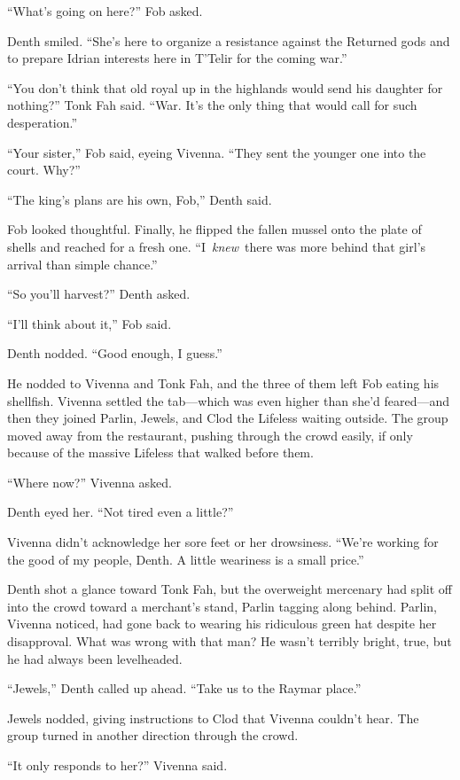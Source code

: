 “What’s going on here?” Fob asked.

Denth smiled. “She’s here to organize a resistance against the Returned gods and to prepare Idrian interests here in T’Telir for the coming war.”

“You don’t think that old royal up in the highlands would send his daughter for nothing?” Tonk Fah said. “War. It’s the only thing that would call for such desperation.”

“Your sister,” Fob said, eyeing Vivenna. “They sent the younger one into the court. Why?”

“The king’s plans are his own, Fob,” Denth said.

Fob looked thoughtful. Finally, he flipped the fallen mussel onto the plate of shells and reached for a fresh one. “I~\textit{knew}~there was more behind that girl’s arrival than simple chance.”

“So you’ll harvest?” Denth asked.

“I’ll think about it,” Fob said.

Denth nodded. “Good enough, I guess.”

He nodded to Vivenna and Tonk Fah, and the three of them left Fob eating his shellfish. Vivenna settled the tab—which was even higher than she’d feared—and then they joined Parlin, Jewels, and Clod the Lifeless waiting outside. The group moved away from the restaurant, pushing through the crowd easily, if only because of the massive Lifeless that walked before them.

“Where now?” Vivenna asked.

Denth eyed her. “Not tired even a little?”

Vivenna didn’t acknowledge her sore feet or her drowsiness. “We’re working for the good of my people, Denth. A little weariness is a small price.”

Denth shot a glance toward Tonk Fah, but the overweight mercenary had split off into the crowd toward a merchant’s stand, Parlin tagging along behind. Parlin, Vivenna noticed, had gone back to wearing his ridiculous green hat despite her disapproval. What was wrong with that man? He wasn’t terribly bright, true, but he had always been levelheaded.

“Jewels,” Denth called up ahead. “Take us to the Raymar place.”

Jewels nodded, giving instructions to Clod that Vivenna couldn’t hear. The group turned in another direction through the crowd.

“It only responds to her?” Vivenna said.

